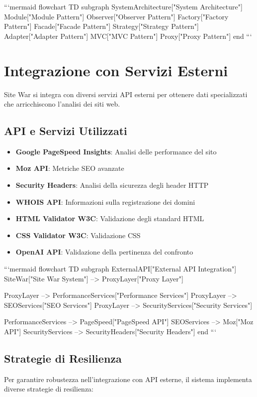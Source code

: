 ```mermaid
flowchart TD
    subgraph SystemArchitecture["System Architecture"]
        Module["Module Pattern"] 
        Observer["Observer Pattern"]
        Factory["Factory Pattern"]
        Facade["Facade Pattern"]
        Strategy["Strategy Pattern"]
        Adapter["Adapter Pattern"]
        MVC["MVC Pattern"] 
        Proxy["Proxy Pattern"]
    end
```

\section{Integrazione con Servizi Esterni}
Site War si integra con diversi servizi API esterni per ottenere dati specializzati che arricchiscono l'analisi dei siti web.

\subsection{API e Servizi Utilizzati}
\begin{itemize}
    \item \textbf{Google PageSpeed Insights}: Analisi delle performance del sito
    \item \textbf{Moz API}: Metriche SEO avanzate
    \item \textbf{Security Headers}: Analisi della sicurezza degli header HTTP
    \item \textbf{WHOIS API}: Informazioni sulla registrazione dei domini
    \item \textbf{HTML Validator W3C}: Validazione degli standard HTML
    \item \textbf{CSS Validator W3C}: Validazione CSS
    \item \textbf{OpenAI API}: Validazione della pertinenza del confronto
\end{itemize}

```mermaid
flowchart TD
    subgraph ExternalAPI["External API Integration"]
        SiteWar["Site War System"] --> ProxyLayer["Proxy Layer"]
        
        ProxyLayer --> PerformanceServices["Performance Services"]
        ProxyLayer --> SEOServices["SEO Services"]
        ProxyLayer --> SecurityServices["Security Services"]
        
        PerformanceServices --> PageSpeed["PageSpeed API"]
        SEOServices --> Moz["Moz API"]
        SecurityServices --> SecurityHeaders["Security Headers"]
    end
```

\subsection{Strategie di Resilienza}
Per garantire robustezza nell'integrazione con API esterne, il sistema implementa diverse strategie di resilienza:

